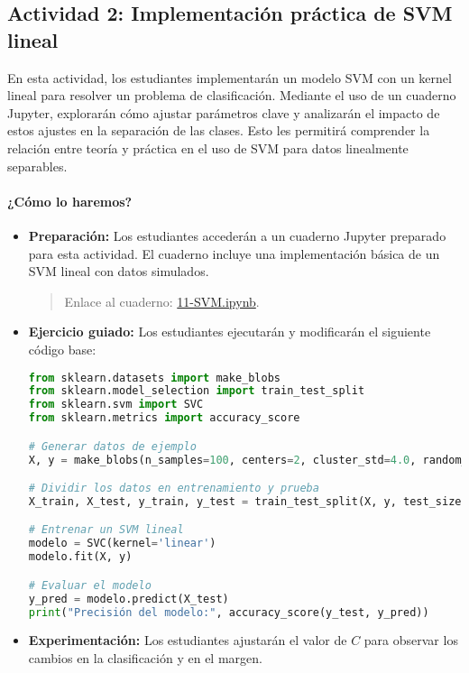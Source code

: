 \documentclass[a4,11pt]{aleph-notas}
\begin{document}
\subsection*{Actividad 2: Implementación práctica de SVM lineal}  
En esta actividad, los estudiantes implementarán un modelo SVM con un kernel lineal para resolver un problema de clasificación. Mediante el uso de un cuaderno Jupyter, explorarán cómo ajustar parámetros clave y analizarán el impacto de estos ajustes en la separación de las clases. Esto les permitirá comprender la relación entre teoría y práctica en el uso de SVM para datos linealmente separables.


\paragraph{¿Cómo lo haremos?}  
\begin{itemize}[leftmargin=*]  
    \item \textbf{Preparación:}  
    Los estudiantes accederán a un cuaderno Jupyter preparado para esta actividad. El cuaderno incluye una implementación básica de un SVM lineal con datos simulados.  
    \begin{quote}
        Enlace al cuaderno: \href{https://colab.research.google.com/github/andres-merino/AprendizajeAutomaticoInicial-05-N0105/blob/main/2-Notebooks/11-SVM.ipynb}{11-SVM.ipynb}.
    \end{quote}
    \item \textbf{Ejercicio guiado:}  
    Los estudiantes ejecutarán y modificarán el siguiente código base:  
\begin{pycodigo}  
\begin{lstlisting}[language=Python]  
from sklearn.datasets import make_blobs
from sklearn.model_selection import train_test_split  
from sklearn.svm import SVC  
from sklearn.metrics import accuracy_score  

# Generar datos de ejemplo  
X, y = make_blobs(n_samples=100, centers=2, cluster_std=4.0, random_state=42)

# Dividir los datos en entrenamiento y prueba
X_train, X_test, y_train, y_test = train_test_split(X, y, test_size=0.3, random_state=42)

# Entrenar un SVM lineal  
modelo = SVC(kernel='linear')  
modelo.fit(X, y)  

# Evaluar el modelo  
y_pred = modelo.predict(X_test)
print("Precisión del modelo:", accuracy_score(y_test, y_pred))
\end{lstlisting}  
\end{pycodigo}  

    \item \textbf{Experimentación:}  
    Los estudiantes ajustarán el valor de \( C \) para observar los cambios en la clasificación y en el margen.  
\end{itemize}  
\end{document}
